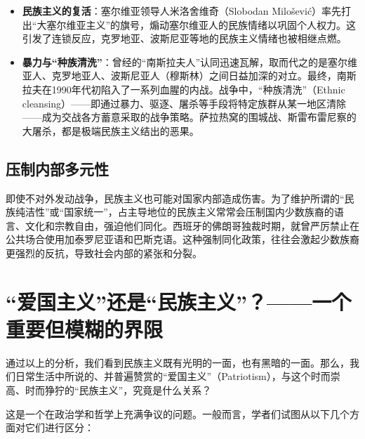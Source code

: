 \begin{itemize}[noitemsep,topsep=0pt]
    \begin{itemize}[noitemsep,topsep=0pt]
        \item \textbf{民族主义的复活}：塞尔维亚领导人米洛舍维奇（Slobodan Milošević）率先打出“大塞尔维亚主义”的旗号，煽动塞尔维亚人的民族情绪以巩固个人权力。这引发了连锁反应，克罗地亚、波斯尼亚等地的民族主义情绪也被相继点燃。
        \item \textbf{暴力与“种族清洗”}：曾经的“南斯拉夫人”认同迅速瓦解，取而代之的是塞尔维亚人、克罗地亚人、波斯尼亚人（穆斯林）之间日益加深的对立。最终，南斯拉夫在1990年代初陷入了一系列血腥的内战。战争中，“种族清洗”（Ethnic cleansing）——即通过暴力、驱逐、屠杀等手段将特定族群从某一地区清除——成为交战各方蓄意采取的战争策略。萨拉热窝的围城战、斯雷布雷尼察的大屠杀，都是极端民族主义结出的恶果。
    \end{itemize}
\end{itemize}

\subsection{ 压制内部多元性}

即使不对外发动战争，民族主义也可能对国家内部造成伤害。为了维护所谓的“民族纯洁性”或“国家统一”，占主导地位的民族主义常常会压制国内少数族裔的语言、文化和宗教自由，强迫他们同化。西班牙的佛朗哥独裁时期，就曾严厉禁止在公共场合使用加泰罗尼亚语和巴斯克语。这种强制同化政策，往往会激起少数族裔更强烈的反抗，导致社会内部的紧张和分裂。

\hrulefill

\section{“爱国主义”还是“民族主义”？——一个重要但模糊的界限}

通过以上的分析，我们看到民族主义既有光明的一面，也有黑暗的一面。那么，我们日常生活中所说的、并普遍赞赏的“爱国主义”（Patriotism），与这个时而崇高、时而狰狞的“民族主义”，究竟是什么关系？

这是一个在政治学和哲学上充满争议的问题。一般而言，学者们试图从以下几个方面对它们进行区分：


